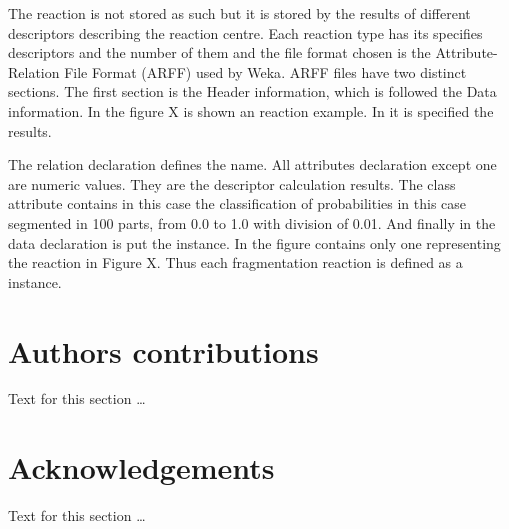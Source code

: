 \documentclass[10pt]{bmc_article}
\newenvironment{bmcformat}{\begin{raggedright}\baselineskip20pt\sloppy\setboolean{publ}{false}}{\end{raggedright}\baselineskip20pt\sloppy}
\begin{document}
\begin{bmcformat}
The reaction is not stored as such but it is stored by the results of different 
descriptors describing the reaction centre. Each reaction type has its 
specifies descriptors and the number of them and the file format chosen is the 
Attribute-Relation File Format (ARFF) used by Weka\cite{weka2005}. ARFF files have 
two distinct sections. The first section is the Header information, which is 
followed the Data information. In the figure X is shown an reaction example. In 
it is specified the results.



The relation declaration defines the name. All attributes declaration except 
one are numeric values. They are the descriptor calculation results. The class 
attribute contains in this case the classification of probabilities in this 
case segmented in 100 parts, from 0.0 to 1.0 with division of 0.01. And finally 
in the data declaration is put the instance. In the figure contains only one 
representing the reaction in Figure X. Thus each fragmentation reaction is 
defined as a instance.



    
\section*{Authors contributions}
    Text for this section \ldots

    

\section*{Acknowledgements}
  Text for this section \ldots


 



\end{bmcformat}
\end{document}
